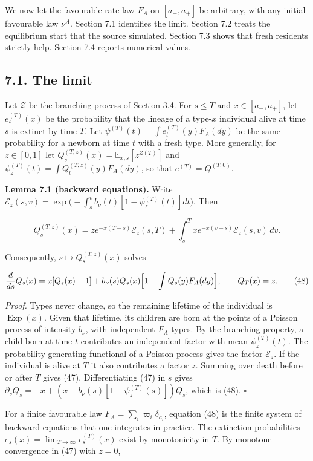 \documentclass[
  british,
  11pt,
  a4paper,
]{article}
\begin{document}
We now let the favourable rate law \(F_A\) on \([a_-,a_+]\) be
arbitrary, with any initial favourable law \(\nu^A\). Section 7.1
identifies the limit. Section 7.2 treats the equilibrium start that the
source simulated. Section 7.3 shows that fresh residents strictly help.
Section 7.4 reports numerical values.

\subsection{7.1. The limit}\label{the-limit}

Let \(\mathcal Z\) be the branching process of Section 3.4. For
\(s\le T\) and \(x\in[a_-,a_+]\), let \(e^{(T)}_s(x)\) be the
probability that the lineage of a type-\(x\) individual alive at time
\(s\) is extinct by time \(T\). Let
\(\psi^{(T)}(t)=\int e^{(T)}_t(y)F_A(dy)\) be the same probability for a
newborn at time \(t\) with a fresh type. More generally, for
\(z\in[0,1]\) let \(Q^{(T,z)}_s(x)=\mathbb E_{x,s}[z^{Z(T)}]\) and
\(\psi^{(T)}_z(t)=\int Q^{(T,z)}_t(y)F_A(dy)\), so that
\(e^{(T)}=Q^{(T,0)}\).

\textbf{Lemma 7.1 (backward equations).} Write
\(\mathcal E_z(s,v)=\exp\bigl(-\int_s^vb_\nu(t)[1-\psi^{(T)}_z(t)]dt\bigr)\).
Then

\[
Q^{(T,z)}_s(x)=ze^{-x(T-s)}\mathcal E_z(s,T)+\int_s^Txe^{-x(v-s)}\mathcal E_z(s,v)\,dv.
\tag{47}
\]

Consequently, \(s\mapsto Q^{(T,z)}_s(x)\) solves

\[
\frac{d}{ds}Q_s(x)=x[Q_s(x)-1]+b_\nu(s)Q_s(x)\Bigl[1-\int Q_s(y)F_A(dy)\Bigr],
\qquad Q_T(x)=z.
\tag{48}
\]

\emph{Proof.} Types never change, so the remaining lifetime of the
individual is \(\operatorname{Exp}(x)\). Given that lifetime, its
children are born at the points of a Poisson process of intensity
\(b_\nu\), with independent \(F_A\) types. By the branching property, a
child born at time \(t\) contributes an independent factor with mean
\(\psi^{(T)}_z(t)\). The probability generating functional of a Poisson
process gives the factor \(\mathcal E_z\). If the individual is alive at
\(T\) it also contributes a factor \(z\). Summing over death before or
after \(T\) gives (47). Differentiating (47) in \(s\) gives
\(\partial_sQ_s=-x+(x+b_\nu(s)[1-\psi^{(T)}_z(s)])Q_s\), which is (48).
\(\square\)

For a finite favourable law \(F_A=\sum_i\varpi_i\delta_{a_i}\), equation
(48) is the finite system of backward equations that one integrates in
practice. The extinction probabilities
\(e_s(x)=\lim_{T\to\infty}e^{(T)}_s(x)\) exist by monotonicity in \(T\).
By monotone convergence in (47) with \(z=0\),
\end{document}
